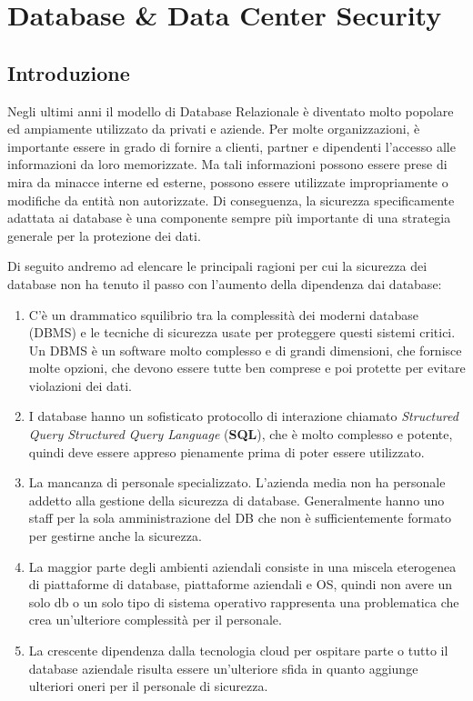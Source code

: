 \chapter{Database \& Data Center Security}
\section{Introduzione} %

Negli ultimi anni il modello di Database Relazionale è diventato molto popolare ed ampiamente utilizzato da
privati e aziende.
Per molte organizzazioni, è importante essere in grado di
fornire a clienti, partner e dipendenti l'accesso alle informazioni da loro memorizzate. Ma tali
informazioni possono essere prese di mira da minacce interne ed esterne, possono essere utilizzate
impropriamente o modifiche da entità non autorizzate. Di conseguenza, la sicurezza
specificamente adattata ai database è una componente sempre più importante di una strategia generale per la protezione dei dati.

Di seguito andremo ad elencare le principali ragioni per cui la sicurezza dei database non ha tenuto il passo con
l'aumento della dipendenza dai database:

\begin{enumerate}
      \item C'è un drammatico squilibrio tra la complessità dei moderni
            database (DBMS) e le tecniche di sicurezza usate per proteggere questi
            sistemi critici. Un DBMS è un software molto complesso e di grandi
            dimensioni, che fornisce molte opzioni, che devono essere tutte ben
            comprese e poi protette per evitare violazioni dei dati.
      \item I database hanno un sofisticato protocollo di interazione chiamato
            \textit{Structured Query Structured Query Language} (\textbf{SQL}),
            che è molto complesso e potente, quindi deve essere appreso pienamente
            prima di poter essere utilizzato.
      \item La mancanza di personale specializzato. L'azienda media non ha
            personale addetto alla gestione della sicurezza di database.
            Generalmente hanno uno staff per la sola amministrazione del DB che
            non è sufficientemente formato per gestirne anche la sicurezza.
      \item La maggior parte degli ambienti aziendali consiste in una miscela
            eterogenea di piattaforme di database, piattaforme aziendali e OS,
            quindi non avere un solo db o un solo tipo di sistema operativo
            rappresenta una problematica che crea un'ulteriore complessità per il
            personale.
      \item La crescente dipendenza dalla tecnologia cloud per ospitare parte o
            tutto il database aziendale risulta essere un'ulteriore sfida in quanto
            aggiunge ulteriori oneri per il
            personale di sicurezza.
\end{enumerate}

